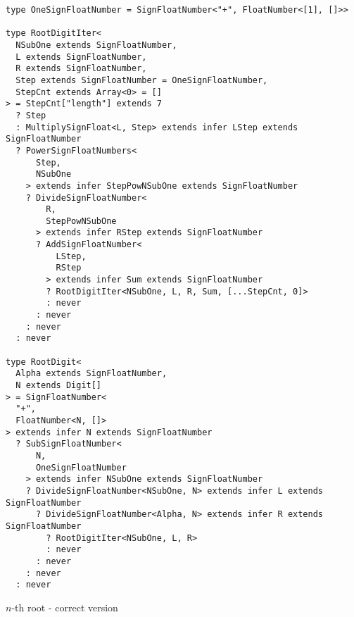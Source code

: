 \begin{listing}[ht]
  \begin{verbatim}
type OneSignFloatNumber = SignFloatNumber<"+", FloatNumber<[1], []>>

type RootDigitIter<
  NSubOne extends SignFloatNumber,
  L extends SignFloatNumber,
  R extends SignFloatNumber,
  Step extends SignFloatNumber = OneSignFloatNumber,
  StepCnt extends Array<0> = []
> = StepCnt["length"] extends 7
  ? Step
  : MultiplySignFloat<L, Step> extends infer LStep extends SignFloatNumber
  ? PowerSignFloatNumbers<
      Step,
      NSubOne
    > extends infer StepPowNSubOne extends SignFloatNumber
    ? DivideSignFloatNumber<
        R,
        StepPowNSubOne
      > extends infer RStep extends SignFloatNumber
      ? AddSignFloatNumber<
          LStep,
          RStep
        > extends infer Sum extends SignFloatNumber
        ? RootDigitIter<NSubOne, L, R, Sum, [...StepCnt, 0]>
        : never
      : never
    : never
  : never

type RootDigit<
  Alpha extends SignFloatNumber,
  N extends Digit[]
> = SignFloatNumber<
  "+",
  FloatNumber<N, []>
> extends infer N extends SignFloatNumber
  ? SubSignFloatNumber<
      N,
      OneSignFloatNumber
    > extends infer NSubOne extends SignFloatNumber
    ? DivideSignFloatNumber<NSubOne, N> extends infer L extends SignFloatNumber
      ? DivideSignFloatNumber<Alpha, N> extends infer R extends SignFloatNumber
        ? RootDigitIter<NSubOne, L, R>
        : never
      : never
    : never
  : never
\end{verbatim}
  \caption{$n$-th root - correct version}\label{lst:root-right}
\end{listing}

\clearpage